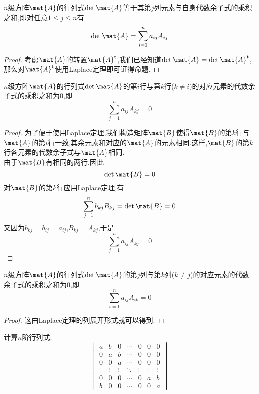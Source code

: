 \documentclass{ctexart}
\begin{document}
\begin{theorem}[Laplace定理按列展开的形式]
    $n$级方阵$\mat{A}$的行列式$\det\mat{A}$等于其第$j$列元素与自身代数余子式的乘积之和,即对任意$1\leqslant j\leqslant n$有
    \[\det\mat{A}=\sum_{i=1}^{n}a_{ij}A_{ij}\]
\end{theorem}
\begin{proof}
    考虑$\mat{A}$的转置$\mat{A}^{\text{t}}$,我们已经知道$\det\mat{A}=\det\mat{A}^{\text{t}}$,那么对$\mat{A}^{\text{t}}$使用Laplace定理即可证得命题.
\end{proof}
\begin{theorem}
    $n$级方阵$\mat{A}$的行列式$\det\mat{A}$的第$i$行与第$k$行($k\neq i$)的对应元素的代数余子式的乘积之和为$0$,即
    \[\sum_{j=1}^{n}a_{ij}A_{kj}=0\]
\end{theorem}
\begin{proof}
    为了便于使用Laplace定理,我们构造矩阵$\mat{B}$使得$\mat{B}$的第$k$行与$\mat{A}$的第$i$行一致,其余元素和对应的$\mat{A}$的元素相同.这样,$\mat{B}$的第$k$行各元素的代数余子式与$\mat{A}$相同.\\
    由于$\mat{B}$有相同的两行,因此
    \[\det\mat{B}=0\]
    对$\mat{B}$的第$k$行应用Laplace定理,有
    \[\sum_{j=1}^{n}b_{kj}B_{kj}=\det\mat{B}=0\]
    又因为$b_{kj}=b_{ij}=a_{ij}$,$B_{kj}=A_{kj}$,于是
    \[\sum_{j=1}^{n}a_{ij}A_{kj}=0\]
\end{proof}
\begin{theorem}
    $n$级方阵$\mat{A}$的行列式$\det\mat{A}$的第$j$列与第$k$列($k\neq j$)的对应元素的代数余子式的乘积之和为$0$,即
    \[\sum_{i=1}^{n}a_{ij}A_{ik}=0\]
\end{theorem}
\begin{proof}
    这由Laplace定理的列展开形式就可以得到.
\end{proof}
\begin{problem}
    计算$n$阶行列式:
    \[\begin{vmatrix}
        a&b&0&\cdots&0&0&0\\
        0&a&b&\cdots&0&0&0\\
        0&0&a&\cdots&0&0&0\\
        \vdots&\vdots&\vdots&\ddots&\vdots&\vdots&\vdots\\
        0&0&0&\cdots&0&a&b\\
        b&0&0&\cdots&0&0&a
    \end{vmatrix}\]
\end{problem}
\end{document}
